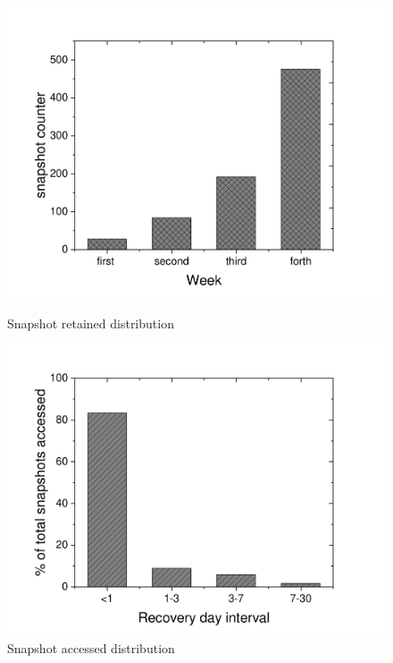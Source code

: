 \documentclass[sigconf, nonacm]{acmart}
\begin{document}

\begin{figure}[htbp]
	\begin{minipage}[t]{0.45\linewidth}
		\includegraphics[width=\linewidth]{figures/ceph_pic/ali_counter_workload.pdf} 
		\caption{Snapshot retained distribution} 
		\label{fig:retained_distribution}
	\end{minipage}
	\hfill%
	\begin{minipage}[t]{0.45\linewidth}
		\includegraphics[width=\linewidth]{figures/ceph_pic/ali_percentage_workload.pdf}
		\caption{Snapshot accessed distribution}
		\label{fig:accessed_distribution}
	\end{minipage} 
\end{figure}
\end{document}

